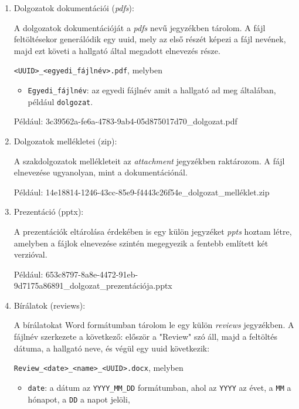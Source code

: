 \begin{enumerate}

\item{Dolgozatok dokumentációi (\textit{pdfs}):}

A dolgozatok dokumentációját a \textit{pdfs} nevű jegyzékben tárolom. 
A fájl feltöltésekor generálódik egy uuid, mely az első részét képezi a fájl nevének, majd ezt követi a hallgató által megadott elnevezés része.

\texttt{<UUID>\_<egyedi\_fájlnév>.pdf}, melyben

\begin{itemize}

\item\texttt{Egyedi\_fájlnév}: az egyedi fájlnév amit a hallgató ad meg általában, például \texttt{dolgozat}.

\end{itemize}

Például: 3c39562a-fe6a-4783-9ab4-05d875017d70\_dolgozat.pdf


\item{Dolgozatok mellékletei (zip):}

A szakdolgozatok mellékleteit az \textit{attachment} jegyzékben raktározom. A fájl elnevezése ugyanolyan, mint a dokumentációnál.

Például: 14e18814-1246-43cc-85e9-f4443c26f54e\_dolgozat\_melléklet.zip

\item{Prezentáció (pptx):}

A prezentációk eltárolása érdekében is egy külön jegyzéket \textit{ppts} hoztam létre, amelyben a fájlok elnevezése szintén megegyezik a fentebb említett két verzióval.

Például: 653c8797-8a8e-4472-91eb-9d7175a86891\_dolgozat\_prezentációja.pptx

\item{Bírálatok (reviews):}

A bírálatokat Word formátumban tárolom le egy külön \textit{reviews} jegyzékben. A fájlnév szerkezete a következő: először a "Review" szó áll, majd a feltöltés dátuma, a hallgató neve, és végül egy uuid következik:

\texttt{Review\_<date>\_<name>\_<UUID>.docx}, melyben

\begin{itemize}
\item \texttt{date}: a dátum az \texttt{YYYY\_MM\_DD} formátumban, ahol az \texttt{YYYY} az évet, a \texttt{MM} a hónapot, a \texttt{DD} a napot jelöli,


\end{itemize}
\end{enumerate}
